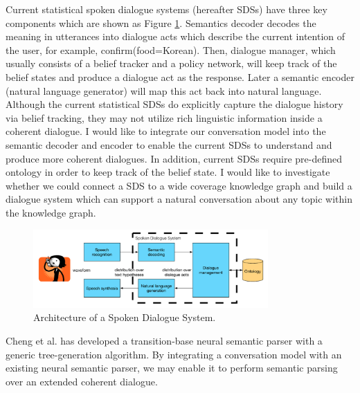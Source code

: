 \documentclass[bsc,frontabs,twoside,singlespacing,parskip,deptreport]{infthesis}     %
\begin{document}
Current statistical spoken dialogue systems (hereafter SDSs) have three key components which are shown as Figure \ref{fig:sds}. Semantics decoder decodes the meaning in utterances into dialogue acts which describe the current intention of the user, for example, confirm(food=Korean). Then, dialogue manager, which usually consists of a belief tracker and a policy network, will keep track of the belief states and produce a dialogue act as the response. Later a semantic encoder (natural language generator) will map this act back into natural language. Although the current statistical SDSs do explicitly capture the dialogue history via belief tracking, they may not utilize rich linguistic information inside a coherent dialogue. I would like to integrate our conversation model into the semantic decoder and encoder to enable the current SDSs to understand and produce more coherent dialogues. In addition, current SDSs require pre-defined ontology in order to keep track of the belief state. I would like to investigate whether we could connect a SDS to a wide coverage knowledge graph and build a dialogue system which can support a natural conversation about any topic within the knowledge graph.

\begin{figure}[h]
    \centering
    \includegraphics[width=0.80\textwidth]{sds.png}
    \caption{Architecture of a Spoken Dialogue System.\cite{gasic}}
    \label{fig:sds}
\end{figure}

Cheng et al.\cite{cheng2019learning} has developed a transition-base neural semantic parser with a generic tree-generation algorithm. By integrating a conversation model with an existing neural semantic parser, we may enable it to perform semantic parsing over an extended coherent dialogue.



\end{document}
